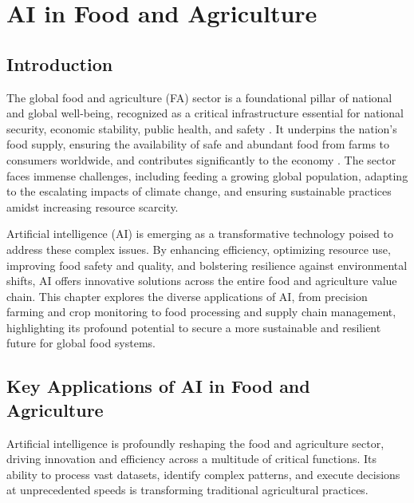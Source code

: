 \chapter{AI in Food and Agriculture}
\label{cha:ai_in_food_and_agriculture}

\section{Introduction}

The global food and agriculture (FA) sector is a foundational pillar of national and global well-being, recognized as a critical infrastructure essential for national security, economic stability, public health, and safety \cite{FDA_Critical, DomesticPreparedness_Critical}. It underpins the nation's food supply, ensuring the availability of safe and abundant food from farms to consumers worldwide, and contributes significantly to the economy \cite{AgribusinessGlobal_Critical}. The sector faces immense challenges, including feeding a growing global population, adapting to the escalating impacts of climate change, and ensuring sustainable practices amidst increasing resource scarcity.

Artificial intelligence (AI) is emerging as a transformative technology poised to address these complex issues. By enhancing efficiency, optimizing resource use, improving food safety and quality, and bolstering resilience against environmental shifts, AI offers innovative solutions across the entire food and agriculture value chain. This chapter explores the diverse applications of AI, from precision farming and crop monitoring to food processing and supply chain management, highlighting its profound potential to secure a more sustainable and resilient future for global food systems.

\section{Key Applications of AI in Food and Agriculture}

Artificial intelligence is profoundly reshaping the food and agriculture sector, driving innovation and efficiency across a multitude of critical functions. Its ability to process vast datasets, identify complex patterns, and execute decisions at unprecedented speeds is transforming traditional agricultural practices.

